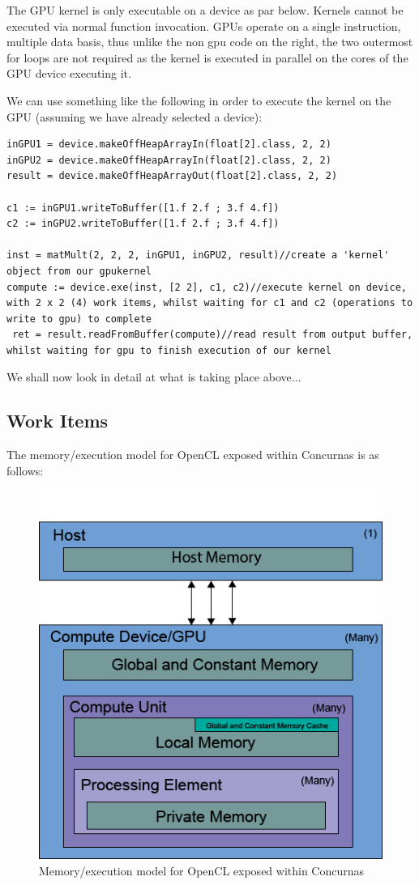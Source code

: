 \documentclass[conc-doc]{subfiles}
\begin{document}
The GPU kernel is only executable on a device as par below. Kernels cannot be executed via normal function invocation. GPUs operate on a single instruction, multiple data basis, thus unlike the non gpu code on the right, the two outermost for loops are not required as the kernel is executed in parallel on the cores of the GPU device executing it. 

We can use something like the following in order to execute the kernel on the GPU (assuming we have already selected a device):
\begin{lstlisting}
inGPU1 = device.makeOffHeapArrayIn(float[2].class, 2, 2)
inGPU2 = device.makeOffHeapArrayIn(float[2].class, 2, 2)
result = device.makeOffHeapArrayOut(float[2].class, 2, 2)

c1 := inGPU1.writeToBuffer([1.f 2.f ; 3.f 4.f])
c2 := inGPU2.writeToBuffer([1.f 2.f ; 3.f 4.f])

inst = matMult(2, 2, 2, inGPU1, inGPU2, result)//create a 'kernel' object from our gpukernel
compute := device.exe(inst, [2 2], c1, c2)//execute kernel on device, with 2 x 2 (4) work items, whilst waiting for c1 and c2 (operations to write to gpu) to complete
 ret = result.readFromBuffer(compute)//read result from output buffer, whilst waiting for gpu to finish execution of our kernel
\end{lstlisting}

We shall now look in detail at what is taking place above...

\subsection{Work Items}
The memory/execution model for OpenCL exposed within Concurnas is as follows:

\begin{figure}[H]
	\centerline{\includegraphics[width=.9\textwidth]{images/gpu-memModel.png}}
	\caption{Memory/execution model for OpenCL exposed within Concurnas}
	\label{fig:memModel}
\end{figure}
\end{document}
